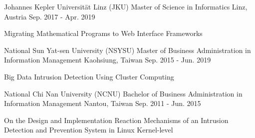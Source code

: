 


\begin{cventries}


\cventry
{Johannes Kepler Universität Linz (JKU)} %
{Master of Science in Informatics} %
{Linz, Austria} %
{Sep. 2017 - Apr. 2019} %
{ %
\begin{cvitems}
\item {Migrating Mathematical Programs to Web Interface Frameworks}
\end{cvitems}
}



\cventry
{National Sun Yat-sen University (NSYSU)} %
{Master of Business Administration in Information Management} %
{Kaohsiung, Taiwan} %
{Sep. 2015 - Jun. 2019} %
{ %
\begin{cvitems}
\item {Big Data Intrusion Detection Using Cluster Computing}
\end{cvitems}
}



\cventry
{National Chi Nan University (NCNU)} %
{Bachelor of Business Administration in Information Management} %
{Nantou, Taiwan} %
{Sep. 2011 - Jun. 2015} %
{ %
\begin{cvitems}
\item {On the Design and Implementation Reaction Mechanisms of an Intrusion Detection and Prevention System in Linux Kernel-level}
\end{cvitems}
}


\end{cventries}